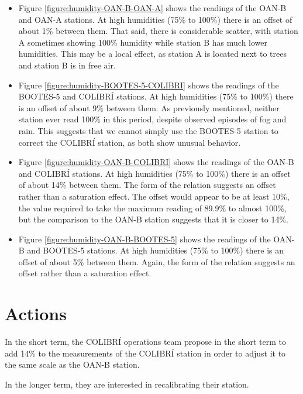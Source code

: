 \documentclass{article}
\begin{document}
\begin{itemize}

\item 
Figure \ref{figure:humidity-OAN-B-OAN-A} shows the readings of the OAN-B and OAN-A stations. At high humidities (75\% to 100\%) there is an offset of about 1\% between them. That said, there is considerable scatter, with station A sometimes showing 100\% humidity while station B has much lower humidities. This may be a local effect, as station A is located next to trees and station B is in free air.

\item 
Figure \ref{figure:humidity-BOOTES-5-COLIBRI} shows the readings of the BOOTES-5 and COLIBRÍ stations. At high humidities (75\% to 100\%) there is an offset of about 9\% between them. As previously mentioned, neither station ever read 100\% in this period, despite observed episodes of fog and rain. This suggests that we cannot simply use the BOOTES-5 station to correct the COLIBRÍ station, as both show unusual behavior.

\item 
Figure \ref{figure:humidity-OAN-B-COLIBRI} shows the readings of the OAN-B and COLIBRÍ stations. At high humidities (75\% to 100\%) there is an offset of about 14\% between them. The form of the relation suggests an offset rather than a saturation effect. The offset would appear to be at least 10\%, the value required to take the maximum reading of 89.9\% to almost 100\%, but the comparison to the OAN-B station suggests that it is closer to 14\%.

\item 
Figure \ref{figure:humidity-OAN-B-BOOTES-5} shows the readings of the OAN-B and BOOTES-5 stations. At high humidities (75\% to 100\%) there is an offset of about 5\% between them. Again, the form of the relation suggests an offset rather than a saturation effect.

\end{itemize}

\section{Actions}

In the short term, the COLIBRÍ operations team propose in the short term to add 14\% to the measurements of the COLIBRÍ station in order to adjust it to the same scale as the OAN-B station. 

In the longer term, they are interested in recalibrating their station.
\end{document}
